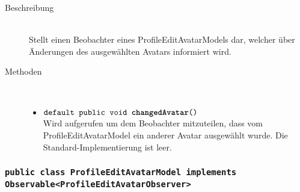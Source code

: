 \begin{description}
\item[Beschreibung] \hfill \\ Stellt einen Beobachter eines ProfileEditAvatarModels dar, welcher über Änderungen des ausgewählten Avatars informiert wird.

\item[Methoden] \hfill \\
	\vspace{-.8cm}
	\begin{itemize}
		\item $\texttt{default public void \textbf{changedAvatar}()}$ \\ Wird aufgerufen um dem Beobachter mitzuteilen, 
		dass vom ProfileEditAvatarModel ein anderer Avatar ausgewählt wurde. Die Standard-Implementierung ist leer.
	\end{itemize}
\end{description}

\subsubsection{\normalfont \texttt{public class \textbf{ProfileEditAvatarModel} implements Observable<ProfileEditAvatarObserver>}}

